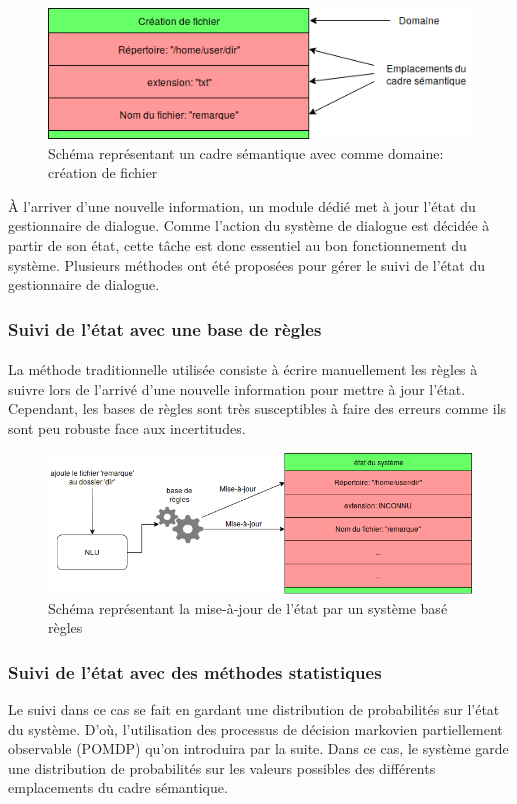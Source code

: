 		\begin{figure}[H]
			\centering
			\includegraphics[width=.7\linewidth]{images/DM/SFrame.png} 
			\caption{Schéma représentant un cadre sémantique avec comme domaine: création de fichier} 
			\label{SFrame}
		\end{figure}


À l’arriver d’une nouvelle information, un module dédié met à jour l’état du gestionnaire de dialogue. Comme l’action du système de dialogue est décidée à partir de son état, cette tâche est donc essentiel au bon fonctionnement du système. Plusieurs méthodes ont été proposées pour gérer le suivi de l’état du gestionnaire de dialogue.
\subsubsection{Suivi de l’état avec une base de règles}
\paragraph{}
La méthode traditionnelle utilisée consiste à écrire manuellement les règles à suivre lors de l’arrivé d’une nouvelle information pour mettre à jour l’état\cite{Goddeau1996}. Cependant, les bases de règles sont très susceptibles à faire des erreurs\cite{Chen2017} comme ils sont peu robuste face aux incertitudes.


\begin{figure}[H]
	\centering
	\includegraphics[width=.7\linewidth]{images/DM/RuleBasedUpdate.png} 
	\caption{Schéma représentant la mise-à-jour de l'état par un système basé règles} 
\end{figure}

\subsubsection{Suivi de l’état avec des méthodes statistiques}
Le suivi dans ce cas se fait en gardant une distribution de probabilités sur l’état du système. D’où, l’utilisation des processus de décision markovien partiellement observable (POMDP)\cite{Young2010} qu’on introduira par la suite. Dans ce cas, le système garde une distribution de probabilités sur les valeurs possibles des différents emplacements du cadre sémantique.

